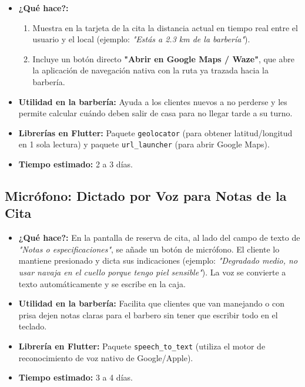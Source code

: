 \documentclass[11pt,a4paper]{article}
\begin{document}
\begin{itemize}
    \item \textbf{¿Qué hace?:} 
    \begin{enumerate}
        \item Muestra en la tarjeta de la cita la distancia actual en tiempo real entre el usuario y el local (ejemplo: \textit{"Estás a 2.3 km de la barbería"}).
        \item Incluye un botón directo \textbf{"Abrir en Google Maps / Waze"}, que abre la aplicación de navegación nativa con la ruta ya trazada hacia la barbería.
    \end{enumerate}
    \item \textbf{Utilidad en la barbería:} Ayuda a los clientes nuevos a no perderse y les permite calcular cuándo deben salir de casa para no llegar tarde a su turno.
    \item \textbf{Librerías en Flutter:} Paquete \texttt{geolocator} (para obtener latitud/longitud en 1 sola lectura) y paquete \texttt{url\_launcher} (para abrir Google Maps).
    \item \textbf{Tiempo estimado:} 2 a 3 días.
\end{itemize}

\subsection{Micrófono: Dictado por Voz para Notas de la Cita}

\begin{itemize}
    \item \textbf{¿Qué hace?:} En la pantalla de reserva de cita, al lado del campo de texto de \textit{"Notas o especificaciones"}, se añade un botón de micrófono. El cliente lo mantiene presionado y dicta sus indicaciones (ejemplo: \textit{"Degradado medio, no usar navaja en el cuello porque tengo piel sensible"}). La voz se convierte a texto automáticamente y se escribe en la caja.
    \item \textbf{Utilidad en la barbería:} Facilita que clientes que van manejando o con prisa dejen notas claras para el barbero sin tener que escribir todo en el teclado.
    \item \textbf{Librería en Flutter:} Paquete \texttt{speech\_to\_text} (utiliza el motor de reconocimiento de voz nativo de Google/Apple).
    \item \textbf{Tiempo estimado:} 3 a 4 días.
\end{itemize}
\end{document}
